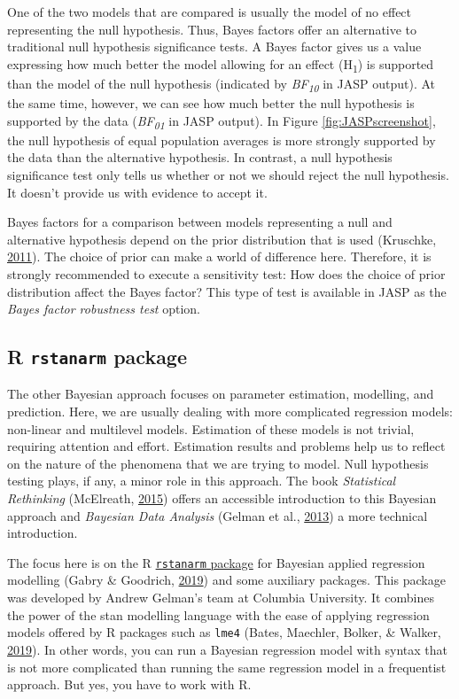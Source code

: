 \documentclass[doc]{apa6}
\begin{document}
One of the two models that are compared is usually the model of no
effect representing the null hypothesis. Thus, Bayes factors offer an
alternative to traditional null hypothesis significance tests. A Bayes
factor gives us a value expressing how much better the model allowing
for an effect (H\textsubscript{1}) is supported than the model of the
null hypothesis (indicated by \emph{BF\textsubscript{10}} in JASP
output). At the same time, however, we can see how much better the null
hypothesis is supported by the data (\emph{BF\textsubscript{01}} in JASP
output). In Figure \ref{fig:JASPscreenshot}, the null hypothesis of
equal population averages is more strongly supported by the data than
the alternative hypothesis. In contrast, a null hypothesis significance
test only tells us whether or not we should reject the null hypothesis.
It doesn't provide us with evidence to accept it.

Bayes factors for a comparison between models representing a null and
alternative hypothesis depend on the prior distribution that is used
(Kruschke,
\protect\hyperlink{ref-kruschkeBayesianAssessmentNull2011}{2011}). The
choice of prior can make a world of difference here. Therefore, it is
strongly recommended to execute a sensitivity test: How does the choice
of prior distribution affect the Bayes factor? This type of test is
available in JASP as the \emph{Bayes factor robustness test} option.

\subsection{\texorpdfstring{R \texttt{rstanarm}
package}{R rstanarm package}}\label{r-rstanarm-package}

The other Bayesian approach focuses on parameter estimation, modelling,
and prediction. Here, we are usually dealing with more complicated
regression models: non-linear and multilevel models. Estimation of these
models is not trivial, requiring attention and effort. Estimation
results and problems help us to reflect on the nature of the phenomena
that we are trying to model. Null hypothesis testing plays, if any, a
minor role in this approach. The book \emph{Statistical Rethinking}
(McElreath,
\protect\hyperlink{ref-McElreathStatisticalRethinkingBayesian2015}{2015})
offers an accessible introduction to this Bayesian approach and
\emph{Bayesian Data Analysis} (Gelman et al.,
\protect\hyperlink{ref-GelmanBayesianDataAnalysis2013}{2013}) a more
technical introduction.

The focus here is on the R
\href{http://mc-stan.org/rstanarm/index.html}{\texttt{rstanarm} package}
for Bayesian applied regression modelling (Gabry \& Goodrich,
\protect\hyperlink{ref-R-rstanarm}{2019}) and some auxiliary packages.
This package was developed by Andrew Gelman's team at Columbia
University. It combines the power of the stan modelling language with
the ease of applying regression models offered by R packages such as
\texttt{lme4} (Bates, Maechler, Bolker, \& Walker,
\protect\hyperlink{ref-R-lme4}{2019}). In other words, you can run a
Bayesian regression model with syntax that is not more complicated than
running the same regression model in a frequentist approach. But yes,
you have to work with R.
\end{document}
